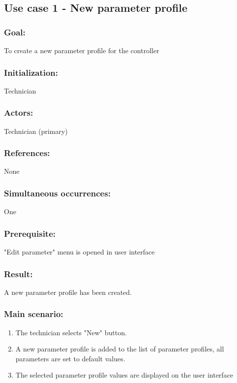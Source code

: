 
\subsection{Use case 1 - New parameter profile}
\subsubsection*{Goal:}
To create a new parameter profile for the controller

\subsubsection*{Initialization:}
Technician

\subsubsection*{Actors:}
Technician (primary)

\subsubsection*{References:}
None

\subsubsection*{Simultaneous occurrences:}
One

\subsubsection*{Prerequisite:}
"Edit parameter" menu is opened in user interface

\subsubsection*{Result:}
A new parameter profile has been created.

\subsubsection*{Main scenario:}
\begin{enumerate}
	\item The technician selects "New" button.
	\item A new parameter profile is added to the list of parameter profiles, all parameters are set to default values.
	\item The selected parameter profile values are displayed on the user interface
\end{enumerate}	

